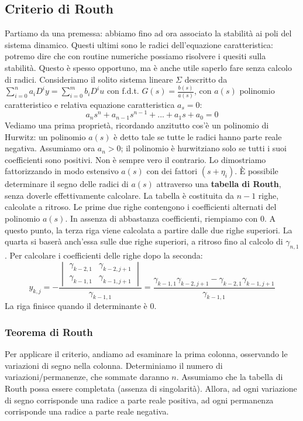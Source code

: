 \documentclass[11pt]{article}
\begin{document}
\subsection{Criterio di Routh}
Partiamo da una premessa: abbiamo fino ad ora associato la stabilità ai poli del sistema dinamico. Questi ultimi sono le radici dell'equazione caratteristica: potremo dire che con routine numeriche possiamo risolvere i quesiti sulla stabilità. Questo è spesso opportuno, ma è anche utile saperlo fare senza calcolo di radici. Consideriamo il solito sistema lineare $\Sigma$ descritto da $\sum_{i=0}^n a_i D^i y = \sum_{i=0}^m b_i D^i u$ con f.d.t. $G(s)= \frac{b(s)}{a(s)}$, con $a(s)$ polinomio caratteristico e relativa equazione caratteristica $a_s=0$:
\begin{displaymath}
    a_ns^n+a_{n-1}s^{n-1}+...+a_1s+a_0=0
\end{displaymath}
Vediamo una prima proprietà, ricordando anzitutto cos'è un polinomio di Hurwitz: un polinomio $a(s)$ è detto tale se tutte le radici hanno parte reale negativa. Assumiamo ora $a_n>0$; il polinomio è hurwitziano solo se tutti i suoi coefficienti sono positivi. Non è sempre vero il contrario. Lo dimostriamo fattorizzando in modo estensivo $a(s)$ con dei fattori $(s+\eta_i)$.
È possibile determinare il segno delle radici di $a(s)$ attraverso una \textbf{tabella di Routh}, senza doverle effettivamente calcolare. La tabella è costituita da $n-1$ righe, calcolate a ritroso. Le prime due righe contengono i coefficienti alternati del polinomio $a(s)$. In assenza di abbastanza coefficienti, riempiamo con 0. A questo punto, la terza riga viene calcolata a partire dalle due righe superiori. La quarta si baserà anch'essa sulle due righe superiori, a ritroso fino al calcolo di $\gamma_{n,1}$. Per calcolare i coefficienti delle righe dopo la seconda:
\begin{displaymath}
    y_{k,j}=-\frac{\begin{vmatrix}
            \gamma_{k-2,1} & \gamma_{k-2,j+1} \\
            \gamma_{k-1,1} & \gamma_{k-1,j+1}
        \end{vmatrix}}{\gamma_{k-1,1}}
    = \frac{\gamma_{k-1,1}\gamma_{k-2,j+1} - \gamma_{k-2,1}\gamma_{k-1,j+1}}{\gamma_{k-1,1}}
\end{displaymath}
La riga finisce quando il determinante è 0.
\subsubsection{Teorema di Routh}
Per applicare il criterio, andiamo ad esaminare la prima colonna, osservando le variazioni di segno nella colonna. Determiniamo il numero di variazioni/permanenze, che sommate daranno $n$.
Assumiamo che la tabella di Routh possa essere completata (assenza di singolarità). Allora, ad ogni variazione di segno corrisponde una radice a parte reale positiva, ad ogni permanenza corrisponde una radice a parte reale negativa.
\end{document}
